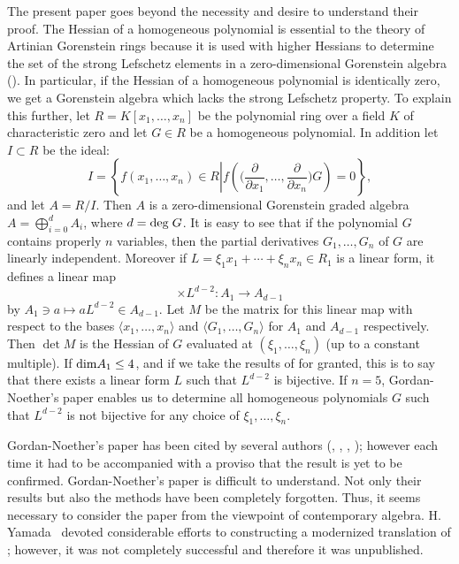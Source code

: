 \documentclass[12pt]{article}
\theoremstyle{definition}
\theoremstyle{remark}
\def\dim{{\rm dim}}
\def\deg{{\rm deg}}
\def\pa{\partial}
\begin{document}
The present paper goes beyond the necessity and desire to understand their proof.   
The Hessian of a homogeneous polynomial 
is essential to the theory of Artinian Gorenstein rings because it is used  
  with higher Hessians to determine the set of the strong Lefschetz elements in a 
 zero-dimensional Gorenstein algebra (\cite{tMjW08zzz}).
In particular, if the Hessian of a homogeneous polynomial is identically zero,  
we get a Gorenstein algebra which lacks  the  strong Lefschetz property. 
To explain this further, let $R=K[x_1, \ldots,x_n]$ be  the polynomial ring over a field $K$ 
of characteristic zero  and let 
$G \in R$ be a homogeneous polynomial.  In addition let $I \subset R$ be the ideal:  
\[I=\left\{ f(x_1, \ldots, x_n) \in R \left| 
f\left(\Big(\frac{\pa }{\pa x_1}, \ldots, \frac{\pa }{\pa x_n}\Big)G\right)=0 \right. \right\},   \]
and let $A=R/I$.   
Then $A$ is a zero-dimensional Gorenstein  graded algebra $A= \bigoplus _{i=0}^d A_i$, where 
$d= \deg\;G$.  It is easy to see that if the polynomial $G$ contains properly $n$ variables, then the partial derivatives 
$G_1, \ldots, G_n$ of $G$ are linearly independent.   
Moreover if 
$L=\xi_1x_1+ \cdots + \xi _n x_n \in R_1$ is a linear form, 
it defines a  linear map  
\[\times L ^{d-2} : A_1  \longrightarrow A_{d-1}\]   
by $A_1 \ni a \mapsto aL^{d-2} \in A_{d-1}$.  Let $M$ be the matrix for this linear map 
with respect to  the bases $\langle x_1, \ldots,  x_n\rangle$ and 
$\langle G_1, \ldots,  G_n\rangle$ for $A_1$ and $A_{d-1}$ respectively.  Then  
 $\det M$ is the Hessian of $G$ evaluated at $(\xi _1, \ldots, \xi _n)$ (up to a constant multiple). 
If $\dim A _1 \leq 4$, 
and if we take the results of \cite{GNzzz} for granted, this is to  say that  
there exists  a linear form  $L$  such that $L ^{d-2}$ is bijective.  
If $n=5$, Gordan-Noether's paper enables us to determine all homogeneous polynomials 
$G$ such that  $L ^{d-2}$ is not bijective for any choice of $\xi_1, \ldots, \xi _n$.  

Gordan-Noether's paper \cite{GNzzz} has been cited by several 
authors (\cite{singhess}, \cite{HMNW}, \cite{tMjW08zzz},  \cite{W2zzz});  however each 
time it had to be accompanied with a proviso that the result is yet to be confirmed. 
Gordan-Noether's paper is difficult to understand. 
Not only their results but also the methods  have been completely forgotten.  
Thus, it seems necessary to consider the paper from the viewpoint of contemporary algebra. 
H. Yamada~\cite{HY} devoted considerable efforts to constructing a 
modernized translation of \cite{GNzzz};  
however,  it  was not completely successful and therefore it was unpublished. 
\end{document}
